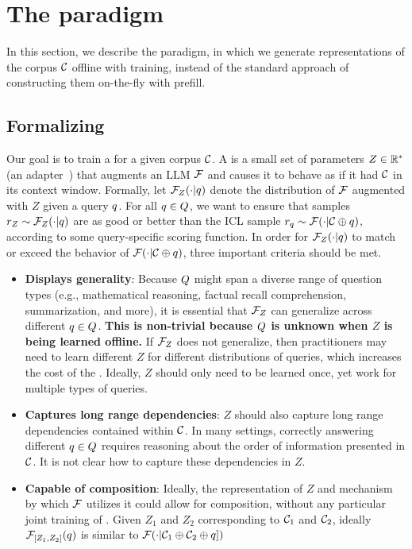\section{The \artifact paradigm}
\label{sec:artifact}
In this section, we describe the \artifact paradigm, in which we generate representations of the corpus $\mathcal{C}$ offline with training, instead of the standard approach of constructing them on-the-fly with prefill.
\vspace{-2mm}
\subsection{Formalizing \artifacts}\label{sec:desiderata}
\label{sec:artifact-desiderata}
Our goal is to train a \artifact for a given corpus $\mathcal{C}$. A \artifact is a small set of parameters $Z \in \mathbb{R}^*$ (\ie an adapter~\cite{li2021prefix,hu2022lora}) that augments an LLM $\mathcal{F}$ and causes it to behave as if it had $\mathcal{C}$ in its context window. Formally, let $\mathcal{F}_Z( \cdot | q )$ denote the distribution of $\mathcal{F}$ augmented with $Z$ given a query $q$. For all $q \in Q$, we want to ensure that samples $r_Z \sim \mathcal{F}_Z(\cdot | q)$ are as good or better than the ICL sample $r_q \sim \mathcal{F}(\cdot | \mathcal{C} \oplus q)$, according to some query-specific scoring function. In order for $\mathcal{F}_Z(\cdot | q)$ to match or exceed the behavior of $\mathcal{F}(\cdot | \mathcal{C} \oplus q)$, three important criteria should be met.
\begin{itemize}[leftmargin=*]
    \item \textbf{Displays generality}: Because $Q$ might span a diverse range of question types (e.g., mathematical reasoning, factual recall comprehension, summarization, and more), it is essential that $\mathcal{F}_Z$ can generalize across different $q \in Q$. \textbf{This is non-trivial because $Q$ is unknown when $Z$ is being learned offline.} If $\mathcal{F}_Z$ does not generalize, then practitioners may need to learn different $Z$ for different distributions of queries, which increases the cost of the \artifact. Ideally, $Z$ should only need to be learned once, yet work for multiple types of queries.
    \item \textbf{Captures long range dependencies}: $Z$ should also capture long range dependencies contained within $\mathcal{C}$. In many settings, correctly answering different $q \in Q$ requires reasoning about the order of information presented in $\mathcal{C}$. It is not clear how to capture these dependencies in $Z$.
    \item \textbf{Capable of composition}: Ideally, the representation of $Z$ and mechanism by which $\mathcal{F}$ utilizes it could allow for composition, without any particular joint training of \artifacts. Given $Z_1$ and $Z_2$ corresponding to $\mathcal{C}_1$ and $\mathcal{C}_2$, ideally $\mathcal{F}_{[Z_1, Z_2]}(q)$ is similar to $\mathcal{F}(\cdot | \mathcal{C}_1 \oplus \mathcal{C}_2 \oplus q])$
\end{itemize}
\vspace{-2mm}
